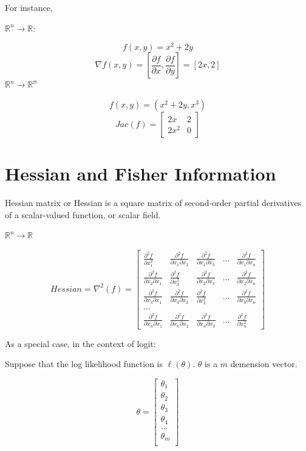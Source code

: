 \documentclass[]{book}
\begin{document}
For instance,

\(\mathbb{R}^n \rightarrow \mathbb{R}\):

\[f(x,y)=x^2+2y\]
\[\nabla f(x,y)=[\frac{\partial f}{\partial x},\frac{\partial f}{\partial y}]=[2x,2]\]
\(\mathbb{R}^n \rightarrow \mathbb{R^m}\)

\[f(x,y)=(x^2+2y,x^3)\]
\[Jac(f)=\begin{bmatrix}
2x & 2\\
2x^2 & 0 
\end{bmatrix}\]

\hypertarget{hessian-and-fisher-information}{%
\section{Hessian and Fisher Information}\label{hessian-and-fisher-information}}

Hessian matrix or Hessian is a square matrix of second-order partial derivatives of a scalar-valued function, or scalar field.

\(\mathbb{R}^n \rightarrow \mathbb{R}\)

\[Hessian=\nabla ^2(f) =\begin{bmatrix}
\frac{\partial^2 f}{\partial x_1^2} & \frac{\partial^2 f}{\partial x_1 \partial x_2} & \frac{\partial^2 f}{\partial x_1 \partial x_3} & ... & \frac{\partial^2 f}{\partial x_1 \partial x_n}\\
\frac{\partial^2 f}{\partial x_2 \partial x_1} & \frac{\partial^2 f}{\partial x_2^2} & \frac{\partial^2 f}{\partial x_2 \partial x_3} & ... & \frac{\partial^2 f}{\partial x_2 \partial x_n} \\
\frac{\partial^2 f}{\partial x_3 \partial x_1} & \frac{\partial^2 f}{\partial x_3 \partial x_2} & \frac{\partial^2 f}{\partial x_3^2} & ... & \frac{\partial^2 f}{\partial x_3 \partial x_n} \\
...\\
\frac{\partial^2 f}{\partial x_n \partial x_1} & \frac{\partial^2 f}{\partial x_n \partial x_2} & \frac{\partial^2 f}{\partial x_n \partial x_3} & ... & \frac{\partial^2 f}{\partial x_n^2}
\end{bmatrix}\]

As a special case, in the context of logit:

Suppose that the log likelihood function is \(\ell (\theta)\). \(\theta\) is a \(m\) demension vector.

\[ \theta = \begin{bmatrix}\theta_1 \\
\theta_2 \\
\theta_3 \\
\theta_4 \\
...\\
\theta_m \\
\end{bmatrix}\]
\end{document}

